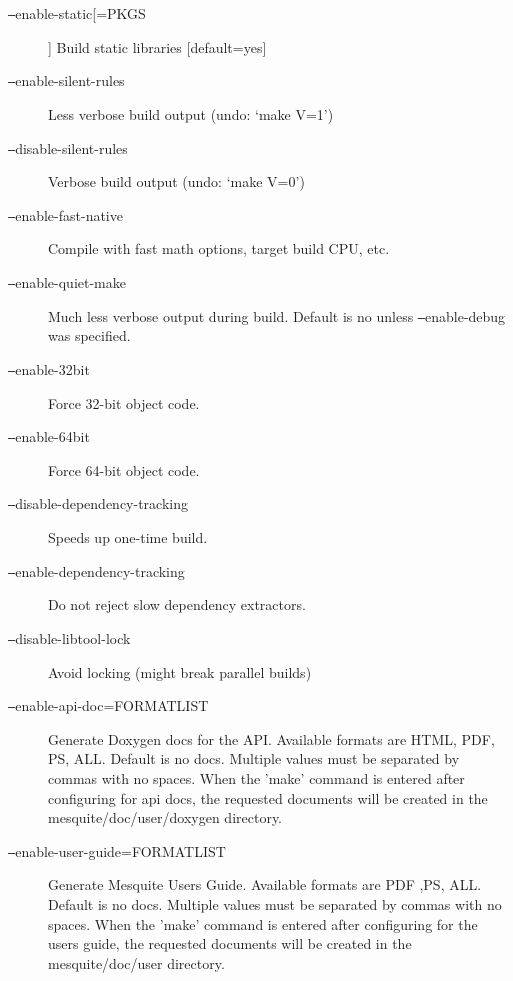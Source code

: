 \begin{description}
\item[\texttt{--}enable-static[=PKGS]]  Build static libraries [default=yes] 
\item[\texttt{--}enable-silent-rules]  Less verbose build output (undo: `make V=1')
\item[\texttt{--}disable-silent-rules]  Verbose build output (undo: `make V=0') 
\item[\texttt{--}enable-fast-native]  Compile with fast math options, target build CPU, etc. 
\item[\texttt{--}enable-quiet-make]  Much less verbose output during build. Default is no unless \texttt{--}enable-debug was specified.
\item[\texttt{--}enable-32bit]  Force 32-bit object code.
\item[\texttt{--}enable-64bit]  Force 64-bit object code.
\item[\texttt{--}disable-dependency-tracking] Speeds up one-time build.
\item[\texttt{--}enable-dependency-tracking]  Do not reject slow dependency extractors. 
\item[\texttt{--}disable-libtool-lock]  Avoid locking (might break parallel builds) 
\item[\texttt{--}enable-api-doc=FORMATLIST]  Generate Doxygen docs for the API. Available formats are 
HTML, PDF, PS, ALL. Default is no docs. Multiple values must be separated by commas with no spaces. When the 'make' command is entered after configuring for api docs, the requested documents will be created in the mesquite/doc/user/doxygen directory.
\item[\texttt{--}enable-user-guide=FORMATLIST]   Generate Mesquite Users Guide. Available formats are PDF ,PS, ALL. Default is no docs. Multiple values must be separated by commas with no spaces.  When the 'make' command is entered after configuring for the users guide, the requested documents will be created in the mesquite/doc/user directory.
\end{description}



